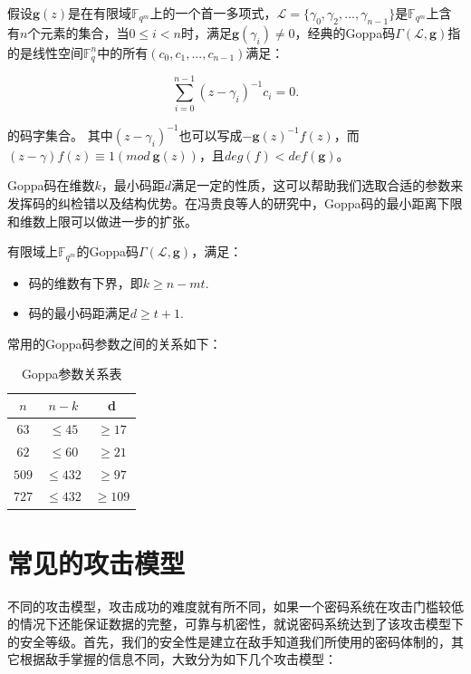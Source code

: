 \begin{define}[Goppa码]
	假设$\mathbf{g}(z)$是在有限域$\mathbb{F}_{q^m}$上的一个首一多项式，$\mathcal{L}=\{\gamma_0,\gamma_2,...,\gamma_{n-1}\}$是$\mathbb{F}_{q^m}$上含有$n$个元素的集合，当$0 \leq i <n$时，满足$\mathbf{g}(\gamma_i)\neq0$，经典的Goppa码$\Gamma(\mathcal{L},\mathbf{g})$指的是线性空间$\mathbb{F}_q^n$中的所有$(c_0,c_1,...,c_{n-1})$满足：
	
    \begin{equation}
        \sum_{i=0}^{n-1} (z - \gamma_i)^{-1}c_i = 0.
    \end{equation}
	
	\begin{flushleft}
		的码字集合。 其中$(z - \gamma_i)^{-1}$也可以写成$-\mathbf{g}(z)^{-1}f(z)$，而$(z-\gamma)f(z) \equiv 1(mod~\mathbf{g}(z))$，且$deg(f) < def(\mathbf{g})$。
	\end{flushleft}
\end{define}

Goppa码在维数$k$，最小码距$d$满足一定的性质，这可以帮助我们选取合适的参数来发挥码的纠检错以及结构优势。在冯贵良等人的研究\cite{冯贵良1983Goppa}中，Goppa码的最小距离下限和维数上限可以做进一步的扩张。

\begin{theorem}
	有限域上$\mathbb{F}_{q^m}$的Goppa码$\Gamma(\mathcal{L},\mathbf{g})$，满足：
	\begin{itemize}
		\item 码的维数有下界，即$k \geq n - mt$.
		\item 码的最小码距满足$d \geq t + 1$.
	\end{itemize}
\end{theorem}

常用的Goppa码参数之间的关系如下：

\begin{table}[H]
	\centering
	\begin{tabular}{c|c|c}
		\hline
		$n$ & $n - k$ & d\\ \hline
		$63$ & $\leq 45$ & $\geq 17$\\
		$62$ & $\leq 60$ & $\geq 21$\\
		$509$ & $\leq 432$ & $\geq 97$\\
		$727$ & $\leq 432$ & $\geq 109$\\
		\hline		
	\end{tabular}
	\caption{Goppa参数关系表}\label{GoppaParameters}
\end{table}

\section{常见的攻击模型}
不同的攻击模型，攻击成功的难度就有所不同，如果一个密码系统在攻击门槛较低的情况下还能保证数据的完整，可靠与机密性，就说密码系统达到了该攻击模型下的安全等级。首先，我们的安全性是建立在敌手知道我们所使用的密码体制的，其它根据敌手掌握的信息不同，大致分为如下几个攻击模型：

